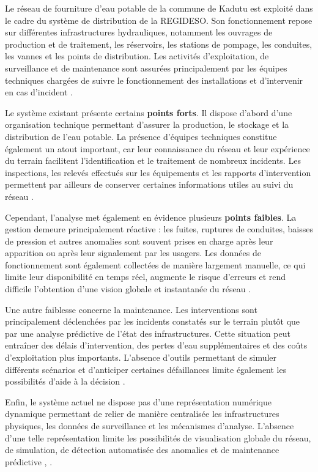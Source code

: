 Le réseau de fourniture d'eau potable de la commune de Kadutu est
exploité dans le cadre du système de distribution de la REGIDESO. Son
fonctionnement repose sur différentes infrastructures hydrauliques,
notamment les ouvrages de production et de traitement, les réservoirs,
les stations de pompage, les conduites, les vannes et les points de
distribution. Les activités d'exploitation, de surveillance et de
maintenance sont assurées principalement par les équipes techniques
chargées de suivre le fonctionnement des installations et d'intervenir
en cas d'incident \cite{ref95}.

Le système existant présente certains \textbf{points forts}. Il dispose
d'abord d'une organisation technique permettant d'assurer la production,
le stockage et la distribution de l'eau potable. La présence d'équipes
techniques constitue également un atout important, car leur connaissance
du réseau et leur expérience du terrain facilitent l'identification et
le traitement de nombreux incidents. Les inspections, les relevés
effectués sur les équipements et les rapports d'intervention permettent
par ailleurs de conserver certaines informations utiles au suivi du
réseau \cite{ref90}.

Cependant, l'analyse met également en évidence plusieurs
\textbf{points faibles}. La gestion demeure principalement réactive :
les fuites, ruptures de conduites, baisses de pression et autres
anomalies sont souvent prises en charge après leur apparition ou après
leur signalement par les usagers. Les données de fonctionnement sont
également collectées de manière largement manuelle, ce qui limite leur
disponibilité en temps réel, augmente le risque d'erreurs et rend
difficile l'obtention d'une vision globale et instantanée du réseau
\cite{ref4}.

Une autre faiblesse concerne la maintenance. Les interventions sont
principalement déclenchées par les incidents constatés sur le terrain
plutôt que par une analyse prédictive de l'état des infrastructures.
Cette situation peut entraîner des délais d'intervention, des pertes
d'eau supplémentaires et des coûts d'exploitation plus importants.
L'absence d'outils permettant de simuler différents scénarios et
d'anticiper certaines défaillances limite également les possibilités
d'aide à la décision \cite{ref98}.

Enfin, le système actuel ne dispose pas d'une représentation numérique
dynamique permettant de relier de manière centralisée les infrastructures
physiques, les données de surveillance et les mécanismes d'analyse.
L'absence d'une telle représentation limite les possibilités de
visualisation globale du réseau, de simulation, de détection automatisée
des anomalies et de maintenance prédictive \cite{ref60},
\cite{ref61}.

